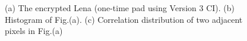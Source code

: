 \begin{figure}
\caption{(a) The encrypted Lena (one-time pad using Version 3 CI). (b) Histogram of Fig.(a). (c) Correlation distribution of two adjacent pixels in Fig.(a)}
\label{Xor_CI}
\end{figure}


